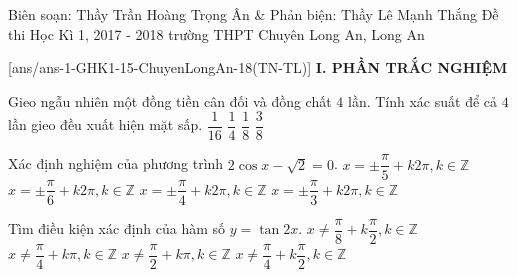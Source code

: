 	\begin{name}
{Biên soạn: Thầy Trần Hoàng Trọng Ân \& Phản biện: Thầy Lê Mạnh Thắng}
		{Đề thi Học Kì 1, 2017 - 2018 trường THPT Chuyên Long An, Long An}
	\end{name}
	\setcounter{ex}{0}\setcounter{bt}{0}
	[ans/ans-1-GHK1-15-ChuyenLongAn-18(TN-TL)]
\noindent\textbf{I. PHẦN TRẮC NGHIỆM}
\begin{ex}%
Gieo ngẫu nhiên một đồng tiền cân đối và đồng chất $ 4 $ lần. Tính xác suất để cả $4$ lần gieo đều xuất hiện mặt sấp.
\choice
{\True $ \dfrac{1}{16} $}
{$ \dfrac{1}{4} $}
{$ \dfrac{1}{8} $}
{$ \dfrac{3}{8} $}
\end{ex}
\begin{ex}%
 Xác định nghiệm của phương trình $2\cos x  -  \sqrt{2}  =  0$.
\choice
{$ x  =  \pm \dfrac{\pi}{5}  +  k2\pi, k\in \mathbb{Z} $}
{$x  =  \pm \dfrac{\pi}{6}  +  k2\pi, k\in \mathbb{Z}$}
{\True $x  =  \pm \dfrac{\pi}{4}  +  k2\pi, k\in \mathbb{Z}$}
{$x  =  \pm \dfrac{\pi}{3}  +  k2\pi, k\in \mathbb{Z}$}
\end{ex}
\begin{ex}%
	Tìm điều kiện xác định của hàm số $y  =  \tan 2x$.
	\choice
	{$x\ne \dfrac{\pi}{8}  +  k\dfrac{\pi}{2},k\in \mathbb{Z}$}	
	{$x\ne \dfrac{\pi}{4}  +  k\pi, k\in \mathbb{Z}$}
	{ $x\ne \dfrac{\pi}{2}  +  k\pi, k\in \mathbb{Z}$}	
	{\True $x\ne \dfrac{\pi}{4}  +  k\dfrac{\pi}{2},k\in \mathbb{Z}$}
	
\end{ex}



